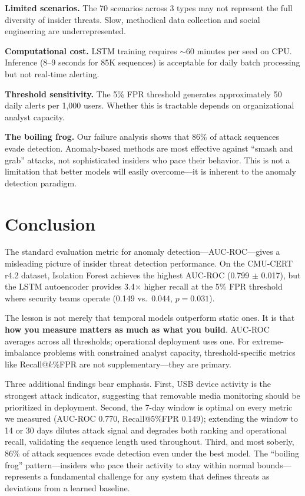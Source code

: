 \documentclass[conference]{IEEEtran}
\begin{document}
\textbf{Limited scenarios.} The 70 scenarios across 3 types may not represent the full diversity of insider threats. Slow, methodical data collection and social engineering are underrepresented.

\textbf{Computational cost.} LSTM training requires ${\sim}$60 minutes per seed on CPU. Inference (8--9 seconds for 85K sequences) is acceptable for daily batch processing but not real-time alerting.

\textbf{Threshold sensitivity.} The 5\% FPR threshold generates approximately 50 daily alerts per 1,000 users. Whether this is tractable depends on organizational analyst capacity.

\textbf{The boiling frog.} Our failure analysis shows that 86\% of attack sequences evade detection. Anomaly-based methods are most effective against ``smash and grab'' attacks, not sophisticated insiders who pace their behavior. This is not a limitation that better models will easily overcome---it is inherent to the anomaly detection paradigm.

\section{Conclusion}
\label{sec:conclusion}

The standard evaluation metric for anomaly detection---AUC-ROC---gives a misleading picture of insider threat detection performance. On the CMU-CERT r4.2 dataset, Isolation Forest achieves the highest AUC-ROC (0.799 $\pm$ 0.017), but the LSTM autoencoder provides 3.4$\times$ higher recall at the 5\% FPR threshold where security teams operate (0.149 vs.\ 0.044, $p = 0.031$).

The lesson is not merely that temporal models outperform static ones. It is that \textbf{how you measure matters as much as what you build}. AUC-ROC averages across all thresholds; operational deployment uses one. For extreme-imbalance problems with constrained analyst capacity, threshold-specific metrics like Recall@$k$\%FPR are not supplementary---they are primary.

Three additional findings bear emphasis. First, USB device activity is the strongest attack indicator, suggesting that removable media monitoring should be prioritized in deployment. Second, the 7-day window is optimal on every metric we measured (AUC-ROC 0.770, Recall@5\%FPR 0.149); extending the window to 14 or 30 days dilutes attack signal and degrades both ranking and operational recall, validating the sequence length used throughout. Third, and most soberly, 86\% of attack sequences evade detection even under the best model. The ``boiling frog'' pattern---insiders who pace their activity to stay within normal bounds---represents a fundamental challenge for any system that defines threats as deviations from a learned baseline.
\end{document}
